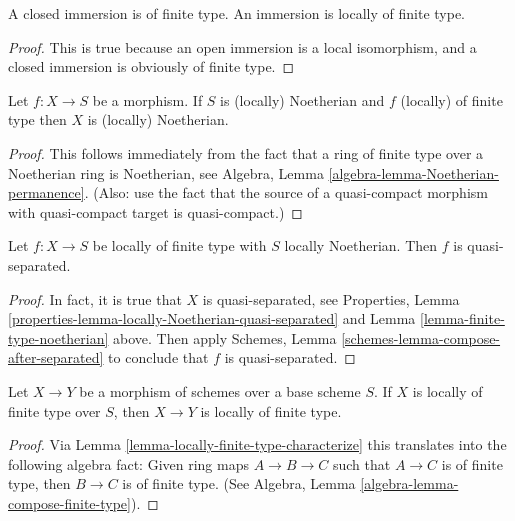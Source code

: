 \begin{lemma}
\label{lemma-immersion-locally-finite-type}
A closed immersion is of finite type.
An immersion is locally of finite type.
\end{lemma}

\begin{proof}
This is true because an open immersion is a local isomorphism,
and a closed immersion is obviously of finite type.
\end{proof}

\begin{lemma}
\label{lemma-finite-type-noetherian}
Let $f : X \to S$ be a morphism.
If $S$ is (locally) Noetherian and $f$ (locally) of finite type
then $X$ is (locally) Noetherian.
\end{lemma}

\begin{proof}
This follows immediately from the fact that a ring
of finite type over a Noetherian ring is Noetherian,
see Algebra, Lemma \ref{algebra-lemma-Noetherian-permanence}.
(Also: use the fact that the source of a quasi-compact morphism
with quasi-compact target is quasi-compact.)
\end{proof}

\begin{lemma}
\label{lemma-finite-type-Noetherian-quasi-separated}
Let $f : X \to S$ be locally of finite type with $S$ locally Noetherian.
Then $f$ is quasi-separated.
\end{lemma}

\begin{proof}
In fact, it is true that $X$ is quasi-separated, see
Properties, Lemma \ref{properties-lemma-locally-Noetherian-quasi-separated}
and Lemma \ref{lemma-finite-type-noetherian} above.
Then apply Schemes, Lemma \ref{schemes-lemma-compose-after-separated}
to conclude that $f$ is quasi-separated.
\end{proof}

\begin{lemma}
\label{lemma-permanence-finite-type}
Let $X \to Y$ be a morphism of schemes over a base scheme $S$.
If $X$ is locally of finite type over $S$, then $X \to Y$
is locally of finite type.
\end{lemma}

\begin{proof}
Via Lemma \ref{lemma-locally-finite-type-characterize} this translates
into the following algebra
fact: Given ring maps $A \to B \to C$ such that $A \to C$ is
of finite type, then $B \to C$ is of finite type.
(See
Algebra, Lemma \ref{algebra-lemma-compose-finite-type}).
\end{proof}







